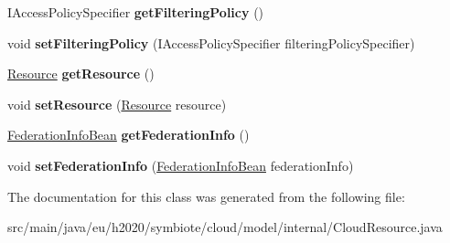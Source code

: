 \begin{DoxyCompactItemize}
I\+Access\+Policy\+Specifier {\bfseries get\+Filtering\+Policy} ()
\item 
\mbox{\label{classeu_1_1h2020_1_1symbiote_1_1cloud_1_1model_1_1internal_1_1CloudResource_a762867d48600df978396c1be262948bb}} 
void {\bfseries set\+Filtering\+Policy} (I\+Access\+Policy\+Specifier filtering\+Policy\+Specifier)
\item 
\mbox{\label{classeu_1_1h2020_1_1symbiote_1_1cloud_1_1model_1_1internal_1_1CloudResource_afc117f109caea3ec21a4522480fb092e}} 
\hyperlink{classeu_1_1h2020_1_1symbiote_1_1model_1_1cim_1_1Resource}{Resource} {\bfseries get\+Resource} ()
\item 
\mbox{\label{classeu_1_1h2020_1_1symbiote_1_1cloud_1_1model_1_1internal_1_1CloudResource_afa302a538a0447a3129e7ed50cf779e6}} 
void {\bfseries set\+Resource} (\hyperlink{classeu_1_1h2020_1_1symbiote_1_1model_1_1cim_1_1Resource}{Resource} resource)
\item 
\mbox{\label{classeu_1_1h2020_1_1symbiote_1_1cloud_1_1model_1_1internal_1_1CloudResource_a9e9020ce763e359220cec99a90afab78}} 
\hyperlink{classeu_1_1h2020_1_1symbiote_1_1cloud_1_1model_1_1internal_1_1FederationInfoBean}{Federation\+Info\+Bean} {\bfseries get\+Federation\+Info} ()
\item 
\mbox{\label{classeu_1_1h2020_1_1symbiote_1_1cloud_1_1model_1_1internal_1_1CloudResource_a71f406cb6078b2760d44be155203fbcf}} 
void {\bfseries set\+Federation\+Info} (\hyperlink{classeu_1_1h2020_1_1symbiote_1_1cloud_1_1model_1_1internal_1_1FederationInfoBean}{Federation\+Info\+Bean} federation\+Info)
\end{DoxyCompactItemize}


The documentation for this class was generated from the following file\+:\begin{DoxyCompactItemize}
\item 
src/main/java/eu/h2020/symbiote/cloud/model/internal/Cloud\+Resource.\+java\end{DoxyCompactItemize}
